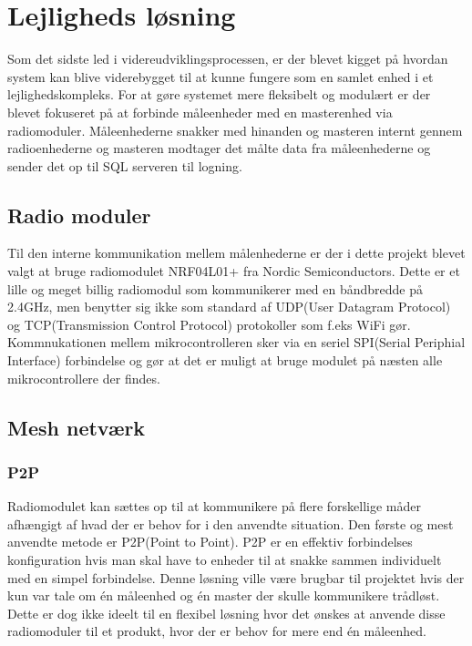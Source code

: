 \section{Lejligheds løsning}
Som det sidste led i videreudviklingsprocessen, er der blevet kigget på hvordan system kan blive viderebygget til at kunne fungere som en samlet enhed i et lejlighedskompleks. For at gøre systemet mere fleksibelt og modulært er der blevet fokuseret på at forbinde måleenheder med en masterenhed via radiomoduler. Måleenhederne snakker med hinanden og masteren internt gennem radioenhederne og masteren modtager det målte data fra måleenhederne og sender det op til SQL serveren til logning.

\subsection{Radio moduler}
Til den interne kommunikation mellem målenhederne er der i dette projekt blevet valgt at bruge radiomodulet NRF04L01+ fra Nordic Semiconductors.
\newline
Dette er et lille og meget billig radiomodul som kommunikerer med en båndbredde på 2.4GHz, men benytter sig ikke som standard af UDP(User Datagram Protocol) og TCP(Transmission Control Protocol) protokoller som f.eks WiFi gør. 
Kommnukationen mellem mikrocontrolleren sker via en seriel SPI(Serial Periphial Interface) forbindelse og gør at det er muligt at bruge modulet på næsten alle mikrocontrollere der findes.

\subsection{Mesh netværk}
\subsubsection*{P2P}
Radiomodulet kan sættes op til at kommunikere på flere forskellige måder afhængigt af hvad der er behov for i den anvendte situation.
Den første og mest anvendte metode er P2P(Point to Point).
\newline
P2P er en effektiv forbindelses konfiguration hvis man skal have to enheder til at snakke sammen individuelt med en simpel forbindelse. Denne løsning ville være brugbar til projektet hvis der kun var tale om én måleenhed og én master der skulle kommunikere trådløst. Dette er dog ikke ideelt til en flexibel løsning hvor det ønskes at anvende disse radiomoduler til et produkt, hvor der er behov for mere end én måleenhed.

